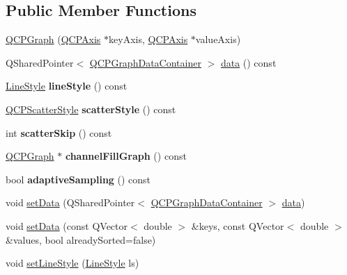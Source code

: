\subsection*{Public Member Functions}
\begin{DoxyCompactItemize}
\item 
\hyperlink{classQCPGraph_a0393a38cf7183cbf46348eb6cf9a5a6c}{Q\+C\+P\+Graph} (\hyperlink{classQCPAxis}{Q\+C\+P\+Axis} $\ast$key\+Axis, \hyperlink{classQCPAxis}{Q\+C\+P\+Axis} $\ast$value\+Axis)
\item 
Q\+Shared\+Pointer$<$ \hyperlink{classQCPDataContainer}{Q\+C\+P\+Graph\+Data\+Container} $>$ \hyperlink{classQCPGraph_a141aa31a1f19bbd0ce60f55eaeb9ea60}{data} () const
\item 
\mbox{\label{classQCPGraph_ac3e6f4b3387338df45992b47691b2551}} 
\hyperlink{classQCPGraph_ad60175cd9b5cac937c5ee685c32c0859}{Line\+Style} {\bfseries line\+Style} () const
\item 
\mbox{\label{classQCPGraph_a36d5b641db08e27527827c212542bbbd}} 
\hyperlink{classQCPScatterStyle}{Q\+C\+P\+Scatter\+Style} {\bfseries scatter\+Style} () const
\item 
\mbox{\label{classQCPGraph_a44487a3a706605bb9fc97ad5e05d347e}} 
int {\bfseries scatter\+Skip} () const
\item 
\mbox{\label{classQCPGraph_a84277b1655474453a5c83318053414d5}} 
\hyperlink{classQCPGraph}{Q\+C\+P\+Graph} $\ast$ {\bfseries channel\+Fill\+Graph} () const
\item 
\mbox{\label{classQCPGraph_a1ba934b9621270b9a40fcdd2d9ba2adb}} 
bool {\bfseries adaptive\+Sampling} () const
\item 
void \hyperlink{classQCPGraph_a1eae9429a316b008e2d99b2d65a54395}{set\+Data} (Q\+Shared\+Pointer$<$ \hyperlink{classQCPDataContainer}{Q\+C\+P\+Graph\+Data\+Container} $>$ \hyperlink{classQCPGraph_a141aa31a1f19bbd0ce60f55eaeb9ea60}{data})
\item 
void \hyperlink{classQCPGraph_a73578d786532132310a926c3cd529b29}{set\+Data} (const Q\+Vector$<$ double $>$ \&keys, const Q\+Vector$<$ double $>$ \&values, bool already\+Sorted=false)
\item 
void \hyperlink{classQCPGraph_a513fecccff5b2a50ce53f665338c60ff}{set\+Line\+Style} (\hyperlink{classQCPGraph_ad60175cd9b5cac937c5ee685c32c0859}{Line\+Style} ls)

\end{DoxyCompactItemize}
